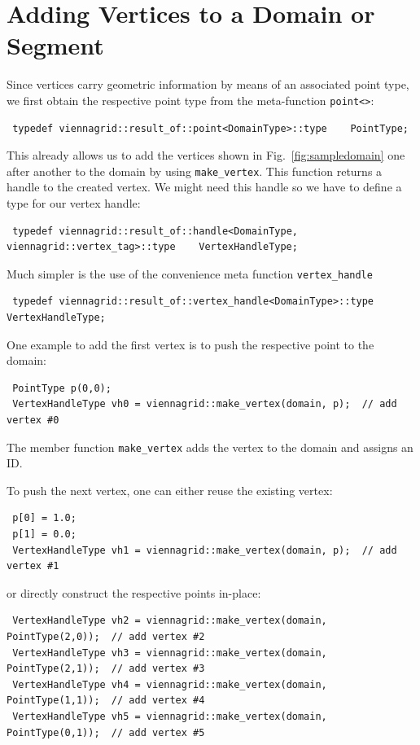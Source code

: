 \section{Adding Vertices to a Domain or Segment}
Since vertices carry geometric information by means of an associated point type, we first obtain the respective point type from the meta-function \lstinline|point<>|:
\begin{lstlisting}
 typedef viennagrid::result_of::point<DomainType>::type    PointType;
\end{lstlisting}
This already allows us to add the vertices shown in Fig.~\ref{fig:sampledomain} one after another to the domain by using \lstinline|make_vertex|. This function returns a handle to the created vertex. We might need this handle so we have to define a type for our vertex handle:
\begin{lstlisting}
 typedef viennagrid::result_of::handle<DomainType, viennagrid::vertex_tag>::type    VertexHandleType;
\end{lstlisting}
Much simpler is the use of the convenience meta function \lstinline|vertex_handle|
\begin{lstlisting}
 typedef viennagrid::result_of::vertex_handle<DomainType>::type    VertexHandleType;
\end{lstlisting}
One example to add the first vertex is to push the respective point to the domain:
\begin{lstlisting}
 PointType p(0,0);
 VertexHandleType vh0 = viennagrid::make_vertex(domain, p);  // add vertex #0
\end{lstlisting}
The member function \lstinline|make_vertex| adds the vertex to the domain and assigns an ID.

To push the next vertex, one can either reuse the existing vertex:
\begin{lstlisting}
 p[0] = 1.0;
 p[1] = 0.0;
 VertexHandleType vh1 = viennagrid::make_vertex(domain, p);  // add vertex #1
\end{lstlisting}
or directly construct the respective points in-place:
\begin{lstlisting}
 VertexHandleType vh2 = viennagrid::make_vertex(domain, PointType(2,0));  // add vertex #2
 VertexHandleType vh3 = viennagrid::make_vertex(domain, PointType(2,1));  // add vertex #3
 VertexHandleType vh4 = viennagrid::make_vertex(domain, PointType(1,1));  // add vertex #4
 VertexHandleType vh5 = viennagrid::make_vertex(domain, PointType(0,1));  // add vertex #5
\end{lstlisting}

